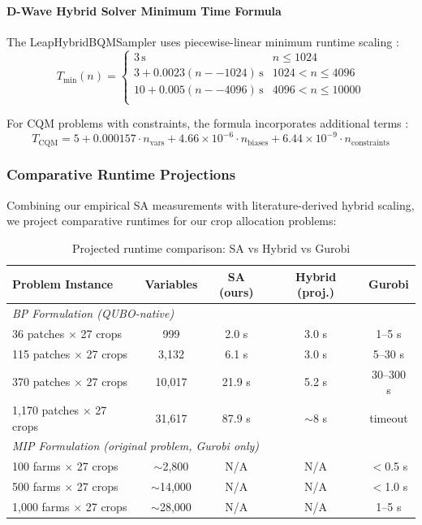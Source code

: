 \documentclass{oqireport}
\begin{document}
\paragraph{D-Wave Hybrid Solver Minimum Time Formula}

The LeapHybridBQMSampler uses piecewise-linear minimum runtime scaling \cite{dwave_hybrid_solver}:
\begin{equation}
T_{\text{min}}(n) = \begin{cases}
3\,\text{s} & n \leq 1024 \\
3 + 0.0023(n -- 1024)\,\text{s} & 1024 < n \leq 4096 \\
10 + 0.005(n -- 4096)\,\text{s} & 4096 < n \leq 10000 \\
\end{cases}
\end{equation}

For CQM problems with constraints, the formula incorporates additional terms \cite{dwave_cqm_solver}:
\begin{equation}
T_{\text{CQM}} = 5 + 0.000157 \cdot n_{\text{vars}} + 4.66 \times 10^{-6} \cdot n_{\text{biases}} + 6.44 \times 10^{-9} \cdot n_{\text{constraints}}
\end{equation}

\subsubsection{Comparative Runtime Projections}

Combining our empirical SA measurements with literature-derived hybrid scaling, we project comparative runtimes for our crop allocation problems:

\begin{table}[H]
\centering
\caption{Projected runtime comparison: SA vs Hybrid vs Gurobi}
\label{tab:runtime_comparison}
\begin{tabular}{@{}lcccc@{}}
\toprule
\textbf{Problem Instance} & \textbf{Variables} & \textbf{SA (ours)} & \textbf{Hybrid (proj.)} & \textbf{Gurobi} \\
\midrule
\multicolumn{5}{l}{\textit{BP Formulation (QUBO-native)}} \\
36 patches $\times$ 27 crops & 999 & 2.0 s & 3.0 s & 1--5 s \\
115 patches $\times$ 27 crops & 3,132 & 6.1 s & 3.0 s & 5--30 s \\
370 patches $\times$ 27 crops & 10,017 & 21.9 s & 5.2 s & 30--300 s \\
1,170 patches $\times$ 27 crops & 31,617 & 87.9 s & $\sim$8 s & timeout \\
\midrule
\multicolumn{5}{l}{\textit{MIP Formulation (original problem, Gurobi only)}} \\
100 farms $\times$ 27 crops & $\sim$2,800 & N/A & N/A & $<$0.5 s \\
500 farms $\times$ 27 crops & $\sim$14,000 & N/A & N/A & $<$1.0 s \\
1,000 farms $\times$ 27 crops & $\sim$28,000 & N/A & N/A & 1--5 s \\
\bottomrule
\end{tabular}
\end{table}
\end{document}
